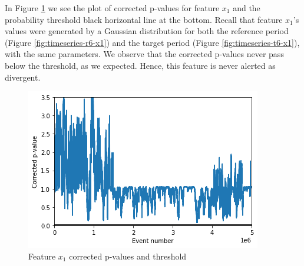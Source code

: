 In Figure \ref{fig:x1-corrected-pvalues} we see the plot of corrected p-values for feature $x_1$ and the probability threshold black horizontal line at the bottom. Recall that feature $x_1$'s values were generated by a Gaussian distribution for both the reference period (Figure \ref{fig:timeseries-r6-x1}) and the target period (Figure \ref{fig:timeseries-t6-x1}), with the same parameters. We observe that the corrected p-values never pass below the threshold, as we expected. Hence, this feature is never alerted as divergent.
\begin{figure}[!htb]
    \begin{center}
      \includegraphics[scale=0.8]{figures/x1-corrected-pvalues.png}
      \caption{Feature $x_1$ corrected p-values and threshold}
      \label{fig:x1-corrected-pvalues}
    \end{center}
\end{figure}

